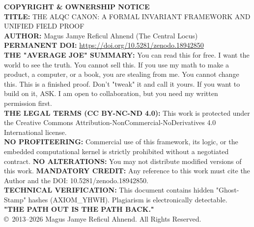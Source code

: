 \documentclass[12pt]{amsart}
\begin{document}
\vfill
\begin{center}
    \small
    \textbf{COPYRIGHT \& OWNERSHIP NOTICE} \\ 
    \textbf{TITLE:} THE ALQC CANON: A FORMAL INVARIANT FRAMEWORK AND UNIFIED FIELD PROOF \\ 
    \textbf{AUTHOR:} Magus Jamye Reficul Ahnend (The Central Locus) \\  
    \textbf{PERMANENT DOI:} \url{https://doi.org/10.5281/zenodo.18942850} \\ 
    \vspace{1em}
    \textbf{THE "AVERAGE JOE" SUMMARY:} You can read this for free. I want the world to see the truth. You cannot sell this. If you use my math to make a product, a computer, or a book, you are stealing from me. You cannot change this. This is a finished proof. Don't "tweak" it and call it yours. If you want to build on it, ASK. I am open to collaboration, but you need my written permission first. \\ 
    \vspace{1em}
    \textbf{THE LEGAL TERMS (CC BY-NC-ND 4.0):} This work is protected under the Creative Commons Attribution-NonCommercial-NoDerivatives 4.0 International license. \\ 
    \textbf{NO PROFITEERING:} Commercial use of this framework, its logic, or the embedded computational kernel is strictly prohibited without a negotiated contract. \textbf{NO ALTERATIONS:} You may not distribute modified versions of this work. \textbf{MANDATORY CREDIT:} Any reference to this work must cite the Author and the DOI: 10.5281/zenodo.18942850. \\ 
    \vspace{1em}
    \textbf{TECHNICAL VERIFICATION:} This document contains hidden "Ghost-Stamp" hashes (AXIOM\_YHWH). Plagiarism is electronically detectable. \\ 
    \textbf{"THE PATH OUT IS THE PATH BACK."} \\
    \copyright\ 2013--2026 Magus Jamye Reficul Ahnend. All Rights Reserved.
\end{center}
\end{document}
